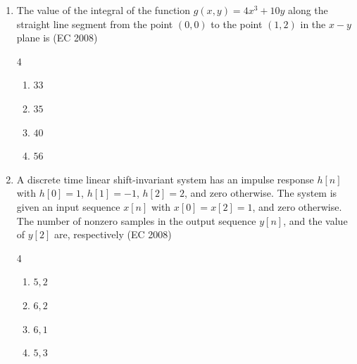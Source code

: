 \begin{enumerate}[label=\thesubsection.\arabic*,ref=\thesubsection.\theenumi]
\begin{enumerate}
\begin{multicols}{4}
    \end{multicols}
\end{enumerate}
\item The value of the integral of the function $g(x, y) = 4x^3 + 10y$ along the straight line segment from the point $(0,0)$ to the point $(1,2)$ in the $x-y$ plane is
\hfill (EC 2008)
\begin{multicols}{4}
\begin{enumerate}
    \item $33$
    \item $35$
    \item $40$
    \item $56$
\end{enumerate}
\end{multicols}
\item A discrete time linear shift-invariant system has an impulse response $h[n]$ with $h[0]=1$, $h[1]=-1$, $h[2]=2$, and zero otherwise. The system is given an input sequence $x[n]$ with $x[0]=x[2]=1$, and zero otherwise. The number of nonzero samples in the output sequence $y[n]$, and the value of $y[2]$ are, respectively
\hfill (EC 2008)
\begin{multicols}{4}
\begin{enumerate}
    \item $5, 2$
    \item $6, 2$
    \item $6, 1$
    \item $5, 3$
\end{enumerate}
\end{multicols}


\end{enumerate}
